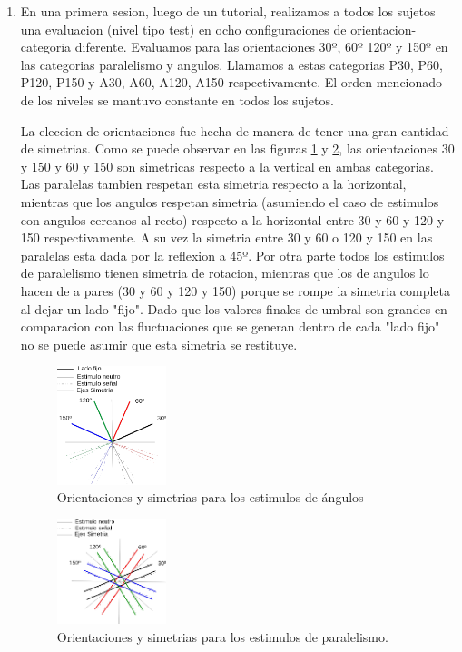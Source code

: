 \documentclass{article}
\begin{document}
\begin{enumerate}
    \item En una primera sesion, luego de un tutorial, realizamos a todos los sujetos una evaluacion (nivel tipo test) en ocho configuraciones de orientacion-categoria diferente. Evaluamos para las orientaciones 30º, 60º 120º y 150º en las categorias paralelismo y angulos. Llamamos a estas categorias P30, P60, P120, P150 y A30, A60, A120, A150 respectivamente. El orden mencionado de los niveles se mantuvo constante en todos los sujetos.
    
    La eleccion de orientaciones fue hecha de manera de tener una gran cantidad de simetrias. Como se puede observar en las figuras \ref{fig:simetriasAngulos} y \ref{fig:simetriasParalelismo}, las orientaciones 30 y 150 y 60 y 150 son simetricas respecto a la vertical en ambas categorias. Las paralelas tambien respetan esta simetria respecto a la horizontal, mientras que los angulos respetan simetria (asumiendo el caso de estimulos con angulos cercanos al recto) respecto a la horizontal entre 30 y 60 y 120 y 150 respectivamente. A su vez la simetria entre 30 y 60 o 120 y 150 en las paralelas esta dada por la reflexion a 45º. Por otra parte todos los estimulos de paralelismo tienen simetria de rotacion, mientras que los de angulos lo hacen de a pares (30 y 60 y 120 y 150) porque se rompe la simetria completa al dejar un lado "fijo". Dado que los valores finales de umbral son grandes en comparacion con las fluctuaciones que se generan dentro de cada "lado fijo" no se puede asumir que esta simetria se restituye. 
    
    \begin{figure}
        \centering
        \includegraphics[width=0.3\textwidth]{Imagenes/SimetriasOrientacionAngulos.png}
        \caption{Orientaciones y simetrias para los estimulos de ángulos}
        \label{fig:simetriasAngulos}
    \end{figure}
    
        \begin{figure}
        \centering
        \includegraphics[width=0.3\textwidth]{Imagenes/SimetriasOrientacionParalelismo.png}
        \caption{Orientaciones y simetrias para los estimulos de paralelismo.}
        \label{fig:simetriasParalelismo}
    \end{figure}
    

\end{enumerate}
\end{document}
